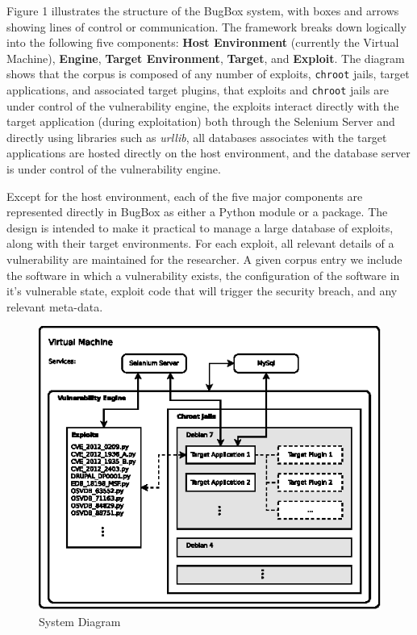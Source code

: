 \documentclass[letterpaper,twocolumn,10pt]{article}
\begin{document}
Figure 1 illustrates the structure of the BugBox system, with boxes and arrows showing lines of control or communication. The framework breaks down logically into the following five components: {\bf Host Environment} (currently the Virtual Machine), {\bf Engine}, {\bf Target Environment}, {\bf Target}, and {\bf Exploit}. The diagram shows that the corpus is composed of any number of exploits, {\tt chroot} jails, target applications, and associated target plugins, that exploits and {\tt chroot} jails are under control of the vulnerability engine, the exploits interact directly with the target application (during exploitation) both through the Selenium Server and directly using libraries such as \emph{urllib}, all databases associates with the target applications are hosted directly on the host environment, and the database server is under control of the vulnerability engine.\par
Except for the host environment, each of the five major components are represented directly in BugBox as either a Python module or a package. The design is intended to make it practical to manage a large database of exploits, along with their target environments. For each exploit, all relevant details of a vulnerability are maintained for the researcher. A given corpus entry we include the software in which a vulnerability exists, the configuration of the software in it's vulnerable state, exploit code that will trigger the security breach, and any relevant meta-data.\par

\begin{figure}[!tp]
\begin{center}
\includegraphics[scale=1.17]{system_diagram.eps}
\end{center}
\caption{System Diagram}
\end{figure}
\end{document}
